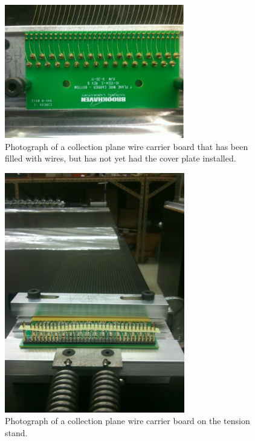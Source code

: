 \begin{figure}[htb]
\centering
\includegraphics[angle =0,width=0.7\textwidth]{figures/wire-carrierboard.png}
\caption{Photograph of a collection plane wire carrier board that has been filled with wires, but has not yet had the cover plate installed.}
\label{fig:carrier-boards}
\end{figure}


\begin{figure}[htb]
\centering
\includegraphics[angle=0,width=0.7\textwidth]{figures/wire-boardtension.png}
\caption{Photograph of a collection plane wire carrier board on the tension stand.}
\label{fig:stress-stand}
\end{figure}



